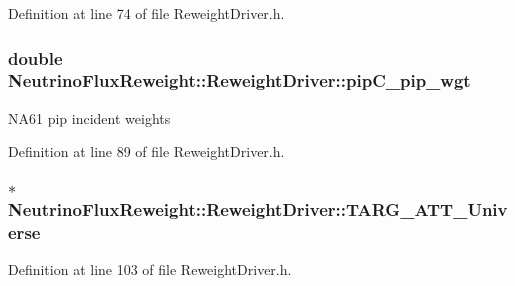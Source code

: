 Definition at line 74 of file Reweight\-Driver.\-h.

\hypertarget{class_neutrino_flux_reweight_1_1_reweight_driver_a61de96d5fb96639323a271dcf0677be0}{
\subsubsection[{pip\-C\-\_\-pip\-\_\-wgt}]{\setlength{\rightskip}{0pt plus 5cm}double Neutrino\-Flux\-Reweight\-::\-Reweight\-Driver\-::pip\-C\-\_\-pip\-\_\-wgt}}\label{class_neutrino_flux_reweight_1_1_reweight_driver_a61de96d5fb96639323a271dcf0677be0}
N\-A61 pip incident weights 

Definition at line 89 of file Reweight\-Driver.\-h.

\hypertarget{class_neutrino_flux_reweight_1_1_reweight_driver_a7f2dbff7048f621b5d9ca403e86f864b}{
\subsubsection[{T\-A\-R\-G\-\_\-\-A\-T\-T\-\_\-\-Universe}]{$\ast$ Neutrino\-Flux\-Reweight\-::\-Reweight\-Driver\-::\-T\-A\-R\-G\-\_\-\-A\-T\-T\-\_\-\-Universe}}\label{class_neutrino_flux_reweight_1_1_reweight_driver_a7f2dbff7048f621b5d9ca403e86f864b}


Definition at line 103 of file Reweight\-Driver.\-h.

